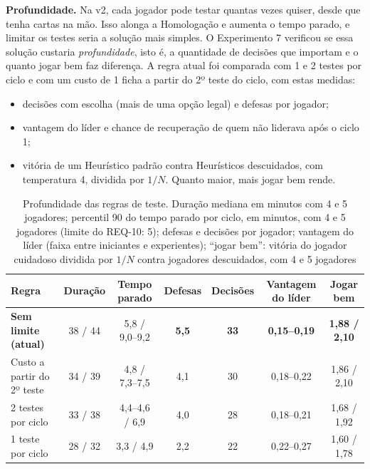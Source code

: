 \textbf{Profundidade.} Na v2, cada jogador pode testar quantas vezes quiser, desde que tenha cartas na mão. Isso
alonga a Homologação e aumenta o tempo parado, e limitar os testes seria a solução mais simples. O Experimento 7
verificou se essa solução custaria \emph{profundidade}, isto é, a quantidade de decisões que importam e o quanto
jogar bem faz diferença. A regra atual foi comparada com 1 e 2 testes por ciclo e com um custo de 1 ficha a partir
do 2º teste do ciclo, com estas medidas:
\begin{itemize}
  \item decisões com escolha (mais de uma opção legal) e defesas por jogador;
  \item vantagem do líder e chance de recuperação de quem não liderava após o ciclo 1;
  \item vitória de um Heurístico padrão contra Heurísticos descuidados, com temperatura 4, dividida por $1/N$.
    Quanto maior, mais jogar bem rende.
\end{itemize}

\begin{table}[ht]
  \centering
  \caption{Profundidade das regras de teste. Duração mediana em minutos com 4 e 5 jogadores; percentil
    90 do tempo parado por ciclo, em minutos, com 4 e 5 jogadores (limite do REQ-10: 5); defesas e decisões
    por jogador; vantagem do líder (faixa entre iniciantes e experientes); ``jogar bem'': vitória do jogador
    cuidadoso dividida por $1/N$ contra jogadores descuidados, com 4 e 5 jogadores}
  \label{tab:profundidade}
  \footnotesize
  \setlength{\tabcolsep}{3pt}
  \begin{tabular}{l c c c c c c}
    \toprule
    Regra & Duração & Tempo parado & Defesas & Decisões & Vantagem do líder & Jogar bem \\
    \midrule
    \textbf{Sem limite (atual)} & 38 / 44 & 5,8 / 9,0--9,2 & \textbf{5,5} & \textbf{33} & \textbf{0,15--0,19} & \textbf{1,88 / 2,10} \\
    Custo a partir do 2º teste & 34 / 39 & 4,8 / 7,3--7,5 & 4,1 & 30 & 0,18--0,22 & 1,86 / 2,10 \\
    2 testes por ciclo & 33 / 38 & 4,4--4,6 / 6,9 & 4,0 & 28 & 0,18--0,21 & 1,68 / 1,92 \\
    1 teste por ciclo & 28 / 32 & 3,3 / 4,9 & 2,2 & 22 & 0,22--0,27 & 1,60 / 1,78 \\
    \bottomrule
  \end{tabular}
\end{table}

